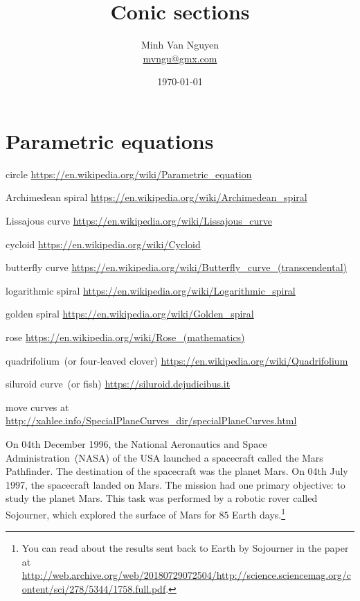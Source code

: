 \documentclass[a4paper,oneside,12pt]{article}
\begin{document}
\title{\Large\bf Conic sections}
\author{%
  Minh Van Nguyen \\
  \url{mvngu@gmx.com}
}
\date{\today}
\maketitle



\section{Parametric equations}

{\color{red}
\begin{packeditem}
\item circle
  \url{https://en.wikipedia.org/wiki/Parametric_equation}

\item Archimedean spiral
  \url{https://en.wikipedia.org/wiki/Archimedean_spiral}

\item Lissajous curve
  \url{https://en.wikipedia.org/wiki/Lissajous_curve}

\item cycloid
  \url{https://en.wikipedia.org/wiki/Cycloid}

\item butterfly curve
  \url{https://en.wikipedia.org/wiki/Butterfly_curve_(transcendental)}

\item logarithmic spiral
  \url{https://en.wikipedia.org/wiki/Logarithmic_spiral}

\item golden spiral
  \url{https://en.wikipedia.org/wiki/Golden_spiral}

\item rose
  \url{https://en.wikipedia.org/wiki/Rose_(mathematics)}

\item quadrifolium~(or four-leaved clover)
  \url{https://en.wikipedia.org/wiki/Quadrifolium}

\item siluroid curve~(or fish)
  \url{https://siluroid.dejudicibus.it}

\item move curves at
  \url{http://xahlee.info/SpecialPlaneCurves_dir/specialPlaneCurves.html}
\end{packeditem}
}

On 04th December 1996, the National Aeronautics and Space
Administration~(NASA) of the USA launched a spacecraft called the Mars
Pathfinder.  The destination of the spacecraft was the planet Mars.
On 04th July 1997, the spacecraft landed on Mars.  The mission had one
primary objective: to study the planet Mars.  This task was performed
by a robotic rover called Sojourner, which explored the surface of
Mars for $85$ Earth days.\footnote{
  You can read about the results sent back to Earth by Sojourner in
  the paper at
  \url{http://web.archive.org/web/20180729072504/http://science.sciencemag.org/content/sci/278/5344/1758.full.pdf}.
}
\end{document}
